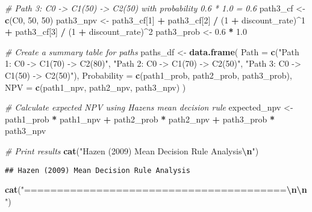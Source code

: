 \documentclass[
]{article}
\newenvironment{Shaded}{\begin{snugshade}}{\end{snugshade}}
\newcommand{\AttributeTok}[1]{\textcolor[rgb]{0.13,0.29,0.53}{#1}}
\newcommand{\CommentTok}[1]{\textcolor[rgb]{0.56,0.35,0.01}{\textit{#1}}}
\newcommand{\DecValTok}[1]{\textcolor[rgb]{0.00,0.00,0.81}{#1}}
\newcommand{\FloatTok}[1]{\textcolor[rgb]{0.00,0.00,0.81}{#1}}
\newcommand{\FunctionTok}[1]{\textcolor[rgb]{0.13,0.29,0.53}{\textbf{#1}}}
\newcommand{\NormalTok}[1]{#1}
\newcommand{\OtherTok}[1]{\textcolor[rgb]{0.56,0.35,0.01}{#1}}
\newcommand{\SpecialCharTok}[1]{\textcolor[rgb]{0.81,0.36,0.00}{\textbf{#1}}}
\newcommand{\StringTok}[1]{\textcolor[rgb]{0.31,0.60,0.02}{#1}}
\begin{document}
\begin{Shaded}
\begin{Highlighting}[]
\CommentTok{\# Path 3: C0 {-}\textgreater{} C1(50) {-}\textgreater{} C2(50) with probability 0.6 * 1.0 = 0.6}
\NormalTok{path3\_cf }\OtherTok{\textless{}{-}} \FunctionTok{c}\NormalTok{(C0, }\DecValTok{50}\NormalTok{, }\DecValTok{50}\NormalTok{)}
\NormalTok{path3\_npv }\OtherTok{\textless{}{-}}\NormalTok{ path3\_cf[}\DecValTok{1}\NormalTok{] }\SpecialCharTok{+} 
\NormalTok{             path3\_cf[}\DecValTok{2}\NormalTok{] }\SpecialCharTok{/}\NormalTok{ (}\DecValTok{1} \SpecialCharTok{+}\NormalTok{ discount\_rate)}\SpecialCharTok{\^{}}\DecValTok{1} \SpecialCharTok{+} 
\NormalTok{             path3\_cf[}\DecValTok{3}\NormalTok{] }\SpecialCharTok{/}\NormalTok{ (}\DecValTok{1} \SpecialCharTok{+}\NormalTok{ discount\_rate)}\SpecialCharTok{\^{}}\DecValTok{2}
\NormalTok{path3\_prob }\OtherTok{\textless{}{-}} \FloatTok{0.6} \SpecialCharTok{*} \FloatTok{1.0}

\CommentTok{\# Create a summary table for paths}
\NormalTok{paths\_df }\OtherTok{\textless{}{-}} \FunctionTok{data.frame}\NormalTok{(}
  \AttributeTok{Path =} \FunctionTok{c}\NormalTok{(}\StringTok{"Path 1: C0 {-}\textgreater{} C1(70) {-}\textgreater{} C2(80)"}\NormalTok{, }
           \StringTok{"Path 2: C0 {-}\textgreater{} C1(70) {-}\textgreater{} C2(50)"}\NormalTok{, }
           \StringTok{"Path 3: C0 {-}\textgreater{} C1(50) {-}\textgreater{} C2(50)"}\NormalTok{),}
  \AttributeTok{Probability =} \FunctionTok{c}\NormalTok{(path1\_prob, path2\_prob, path3\_prob),}
  \AttributeTok{NPV =} \FunctionTok{c}\NormalTok{(path1\_npv, path2\_npv, path3\_npv)}
\NormalTok{)}

\CommentTok{\# Calculate expected NPV using Hazen\textquotesingle{}s mean decision rule}
\NormalTok{expected\_npv }\OtherTok{\textless{}{-}}\NormalTok{ path1\_prob }\SpecialCharTok{*}\NormalTok{ path1\_npv }\SpecialCharTok{+} 
\NormalTok{                path2\_prob }\SpecialCharTok{*}\NormalTok{ path2\_npv }\SpecialCharTok{+} 
\NormalTok{                path3\_prob }\SpecialCharTok{*}\NormalTok{ path3\_npv}

\CommentTok{\# Print results}
\FunctionTok{cat}\NormalTok{(}\StringTok{"Hazen (2009) Mean Decision Rule Analysis}\SpecialCharTok{\textbackslash{}n}\StringTok{"}\NormalTok{)}
\end{Highlighting}
\end{Shaded}

\begin{verbatim}
## Hazen (2009) Mean Decision Rule Analysis
\end{verbatim}

\begin{Shaded}
\begin{Highlighting}[]
\FunctionTok{cat}\NormalTok{(}\StringTok{"========================================}\SpecialCharTok{\textbackslash{}n\textbackslash{}n}\StringTok{"}\NormalTok{)}
\end{Highlighting}
\end{Shaded}
\end{document}

